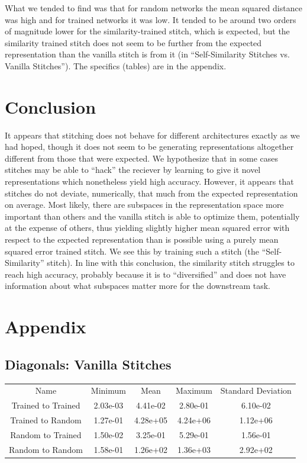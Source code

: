 \documentclass{article} %
\begin{document}
What we tended to find was that for random networks the mean squared distance was high and for trained networks it was
low. It tended to be around two orders of magnitude lower for the similarity-trained stitch, which is expected, but the
similarity trained stitch does not seem to be further from the expected representation than the vanilla stitch is from it
(in ``Self-Similarity Stitches vs. Vanilla Stitches''). The specifics (tables) are in the appendix.
   
\section*{Conclusion}
It appears that stitching does not behave for different architectures exactly as we had hoped, though it does not seem
to be generating representations altogether different from those that were expected. We hypothesize that in some cases
stitches may be able to ``hack'' the reciever by learning to give it novel representations which nonetheless yield high
accuracy. However, it appears that stitches do not deviate, numerically, that much from the expected representation on
average. Most likely, there are subspaces in the representation space more important than others and the vanilla stitch
is able to optimize them, potentially at the expense of others, thus yielding slightly higher mean squared error with
respect to the expected representation than is possible using a purely mean squared error trained stitch. We see this
by training such a stitch (the ``Self-Similarity'' stitch). In line with this conclusion, the similarity stitch struggles
to reach high accuracy, probably because it is to ``diversified'' and does not have information about what subspaces
matter more for the downstream task.

\section*{Appendix}
\subsection*{Diagonals: Vanilla Stitches}
\begin{tabular}{c c c c c}
   Name&Minimum&Mean&Maximum&Standard Deviation\\
   Trained to Trained&2.03e-03&4.41e-02&2.80e-01&6.10e-02\\
   Trained to Random&1.27e-01&4.28e+05&4.24e+06&1.12e+06\\
   Random to Trained&1.50e-02&3.25e-01&5.29e-01&1.56e-01\\
   Random to Random&1.58e-01&1.26e+02&1.36e+03&2.92e+02\\
\end{tabular}
\end{document}
